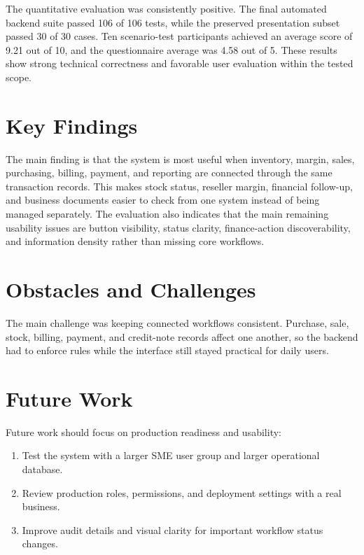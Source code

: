 The quantitative evaluation was consistently positive. The final automated backend suite passed 106 of 106 tests, while the preserved presentation subset passed 30 of 30 cases. Ten scenario-test participants achieved an average score of 9.21 out of 10, and the questionnaire average was 4.58 out of 5. These results show strong technical correctness and favorable user evaluation within the tested scope.

\section{Key Findings}
The main finding is that the system is most useful when inventory, margin, sales, purchasing, billing, payment, and reporting are connected through the same transaction records. This makes stock status, reseller margin, financial follow-up, and business documents easier to check from one system instead of being managed separately. The evaluation also indicates that the main remaining usability issues are button visibility, status clarity, finance-action discoverability, and information density rather than missing core workflows.

\section{Obstacles and Challenges}
The main challenge was keeping connected workflows consistent. Purchase, sale, stock, billing, payment, and credit-note records affect one another, so the backend had to enforce rules while the interface still stayed practical for daily users.

\section{Future Work}
Future work should focus on production readiness and usability:

\begin{enumerate}
	\item Test the system with a larger SME user group and larger operational database.
	\item Review production roles, permissions, and deployment settings with a real business.
	\item Improve audit details and visual clarity for important workflow status changes.
\end{enumerate}
